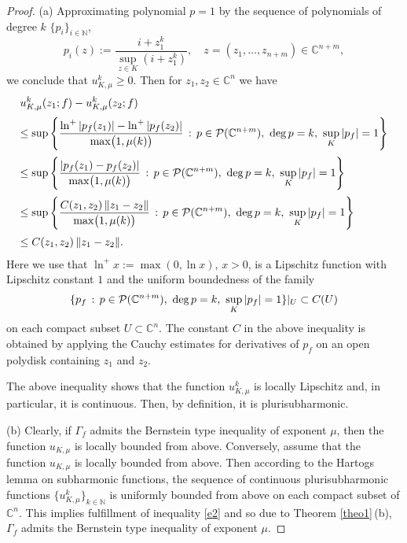 \documentclass[11pt, oneside]{amsart}
\begin{document}
\begin{proof}
(a) Approximating polynomial $p=1$ by the sequence of polynomials of degree $k$ $\{p_i\}_{i\in\mathbb N}$, 
\begin{equation}\label{equ3.21}
p_i(z):=\frac{i+z_1^k}{\sup_{z\in K} (i+z_1^k)},\quad z=(z_1,\dots, z_{n+m})\in\mathbb C^{n+m},
\end{equation}
we conclude that $u_{K,\mu}^k\ge 0$.
Then for $z_1,z_2\in\mathbb C^n$ we have 
\[
\begin{array}{l}
\displaystyle
u_{K,\mu}^k(z_1;f)-u_{K,\mu}^k(z_2;f)\medskip\\
\displaystyle
\le \sup\left\{\frac{\ln^+ |p_f(z_1)|-\ln^+ |p_f(z_2)|}{\max\bigl(1,\mu(k)\bigr)}\, :\, p\in\mathcal P(\mathbb C^{n+m}),\ {\rm deg}\,p= k,\ \sup_{K}|
p_f|=1\right\}\medskip\\
\displaystyle \le \sup\left\{\frac{|p_f(z_1)-p_f(z_2)|}{\max\bigl(1,\mu(k)\bigr)}\, :\, p\in\mathcal P(\mathbb C^{n+m}),\ {\rm deg}\,p= k,\ \sup_{K}|p_f|=1\right\}\medskip\\
\displaystyle \le  \sup\left\{\frac{C(z_1,z_2)\,\|z_1-z_2\|}{\max\bigl(1,\mu(k)\bigr)}\, :\, p\in\mathcal P(\mathbb C^{n+m}),\ {\rm deg}\,p= k,\ \sup_{K}|p_f|=1\right\}\medskip\\
\displaystyle \le C(z_1,z_2)\,\|z_1-z_2\|.
\end{array}
\]
Here we use that $\ln^+ x:=\max(0,\ln x)$, $x>0$, is a Lipschitz function with Lipschitz constant $1$ and  the uniform boundedness of the family 
\[
\{p_f\, :\, p\in\mathcal P(\mathbb C^{n+m}),\ {\rm deg}\,p= k,\ \sup_{K}|p_f|=1\}|_{U}\subset C(U)
\]
on each compact subset $U\subset\mathbb C^n$. The constant $C$ in the above inequality is obtained by applying the Cauchy estimates for derivatives of $p_f$ on an open polydisk containing $z_1$ and $z_2$.

The above inequality shows that the function $u_{K,\mu}^k$ is locally Lipschitz and, in particular, it is continuous. Then, by definition, it is plurisubharmonic.\smallskip

(b) Clearly, if $\Gamma_f$ admits the Bernstein type inequality of exponent $\mu$, then the function $u_{K,\mu}$ is locally bounded from above. Conversely, assume that the function $u_{K,\mu}$ is locally bounded from above. Then according to the Hartogs lemma on subharmonic functions, the sequence of continuous plurisubharmonic functions $\{u_{K,\mu}^k\}_{k\in\mathbb N}$ is uniformly bounded from above on each compact subset of $\mathbb C^n$. This implies fulfillment of inequality \eqref{e2} and so due to Theorem \ref{theo1}\,(b), $\Gamma_f$ admits the Bernstein type inequality of exponent $\mu$. \smallskip


\end{proof}
\end{document}

